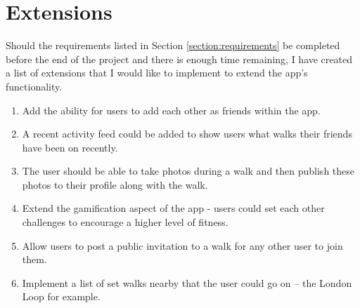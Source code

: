\section{Extensions}

Should the requirements listed in Section \ref{section:requirements} be completed before the end of the project and there is enough time remaining, I have created a list of extensions that I would like to implement to extend the app's functionality.

\begin{enumerate}[label=\textbf{Ext \arabic*}]
  \item Add the ability for users to add each other as friends within the app.
  \item A recent activity feed could be added to show users what walks their friends have been on recently.
  \item The user should be able to take photos during a walk and then publish these photos to their profile along with the walk.
  \item Extend the gamification aspect of the app - users could set each other challenges to encourage a higher level of fitness.
  \item Allow users to post a public invitation to a walk for any other user to join them.
  \item Implement a list of set walks nearby that the user could go on -- the London Loop for example.
\end{enumerate}